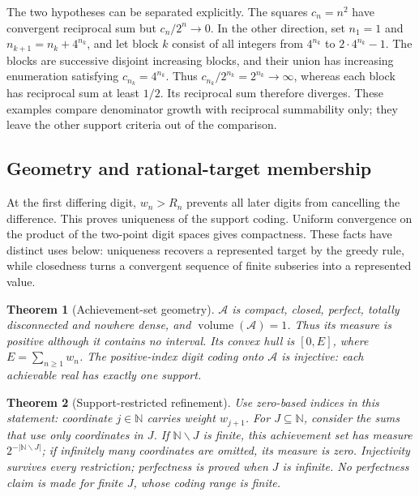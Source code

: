 \documentclass[11pt]{article}
\theoremstyle{plain}
\newtheorem{thm}{Theorem}[section]
\theoremstyle{definition}
\theoremstyle{remark}
\newcommand{\N}{\mathbb{N}}
\begin{document}
The two hypotheses can be separated explicitly. The squares $c_n=n^2$ have
convergent reciprocal sum but $c_n/2^n\to0$.  In the other direction,
set $n_1=1$ and $n_{k+1}=n_k+4^{n_k}$, and let block $k$ consist of
all integers from $4^{n_k}$ to $2\cdot4^{n_k}-1$.  The blocks are
successive disjoint increasing blocks, and their union has increasing
enumeration satisfying $c_{n_k}=4^{n_k}$.  Thus
$c_{n_k}/2^{n_k}=2^{n_k}\to\infty$, whereas each block has reciprocal
sum at least $1/2$.  Its reciprocal sum therefore diverges.
These examples compare denominator growth with reciprocal summability
only; they leave the other support criteria out of the comparison.

\subsection{Geometry and rational-target membership}
At the first differing digit, $w_n>R_n$ prevents all later digits from
cancelling the difference. This proves uniqueness of the support coding.
Uniform convergence on the product of the two-point digit spaces gives
compactness. These facts have distinct uses below: uniqueness recovers
a represented target by the greedy rule, while closedness turns a
convergent sequence of finite subseries into a represented value.


\begin{thm}[Achievement-set geometry]
\label{thm:geometry}
$\mathcal{A}$ is compact, closed, perfect, totally disconnected and nowhere dense, and
$\operatorname{volume}(\mathcal{A}) = 1$.  Thus its measure is positive
although it contains no interval.  Its convex hull is $[0,E]$, where
$E=\sum_{n\ge1}w_n$.  The positive-index digit coding onto
$\mathcal{A}$ is injective: each achievable real has \emph{exactly one} support.
\end{thm}

\begin{thm}[Support-restricted refinement]
\label{thm:supported-dichotomy}
Use zero-based indices in this statement: coordinate $j\in\N$ carries
weight $w_{j+1}$.  For $J\subseteq\N$, consider the sums that use only
coordinates in $J$.  If $\N\smallsetminus J$ is finite, this achievement set
has measure $2^{-|\N\smallsetminus J|}$; if infinitely many coordinates are
omitted, its measure is zero.  Injectivity survives every restriction;
perfectness is proved when $J$ is infinite.  No perfectness claim is made for
finite $J$, whose coding range is finite.
\end{thm}
\end{document}
